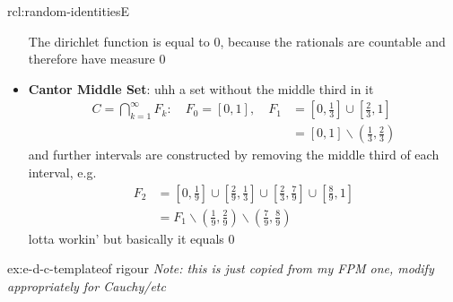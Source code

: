 \documentclass[landscape, 8pt]{extarticle}
\begin{document}
\begin{multicols}{3}
\begin{rcl}{rcl:random-identities}{E}
\begin{itemize}
		The dirichlet function is equal to $0$, because the rationals are countable and therefore have measure $0$
		\item \textbf{Cantor Middle Set}: uhh a set without the middle third in it
			\begin{align*}
				C = \bigcap\limits_{k = 1}^{\infty} F_{k}:\quad \text{$F_{0} = [0,1]$},\quad F_{1} &= \left[0, \frac{1}{3}\right] \cup \left[ \frac{2}{3}, 1\right] \\
																												   &= [0, 1] \backslash \left( \frac{1}{3}, \frac{2}{3}\right)
			\end{align*}
		and further intervals are constructed by removing the middle third of each interval, e.g.
		\begin{align*}
			F_{2} &= \left[0, \frac{1}{9}\right] \cup \left[ \frac{2}{9}, \frac{1}{3}\right] \cup \left[ \frac{2}{3}, \frac{7}{9}\right] \cup \left[ \frac{8}{9}, 1\right] \\
				  &= F_{1} \backslash \left(\frac{1}{9}, \frac{2}{9}\right) \backslash \left( \frac{7}{9}, \frac{8}{9}\right)
		\end{align*}
		lotta workin' but basically it equals $0$
	\end{itemize}
\end{rcl}

\begin{xmp}{ex:e-d-c-template}{of rigour}
	\textit{Note: this is just copied from my FPM one, modify appropriately for Cauchy/etc}


\end{xmp}
\end{multicols}
\end{document}
